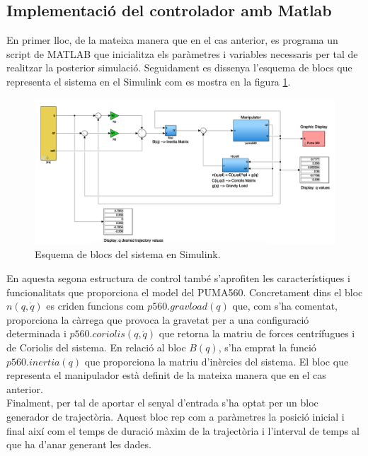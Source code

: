 \documentclass[]{article}
\begin{document}
\subsection{Implementació del controlador amb Matlab}
En primer lloc, de la mateixa manera que en el cas anterior, es programa un script de MATLAB que inicialitza els paràmetres i variables necessaris per tal de realitzar la posterior simulació. Seguidament es dissenya l'esquema de blocs que representa el sistema en el Simulink com es mostra en la figura \ref{fig:Inverse_dynamics_simulink}. 

\begin{figure}[H]
\centering
    \includegraphics[width = 1\linewidth]{images/Inverse_Dynamics_Simulink.png}
    \caption{Esquema de blocs del sistema en Simulink.}
    \label{fig:Inverse_dynamics_simulink}
\end{figure}

En aquesta segona estructura de control també s'aprofiten les característiques i funcionalitats que proporciona el model del PUMA560. Concretament dins el bloc $n(q,\dot{q})$ es criden funcions com $p560.gravload(q)$ que, com s'ha comentat, proporciona la càrrega que provoca la gravetat per a una configuració determinada i $p560.coriolis(q,\dot{q})$ que retorna la matriu de forces centrífugues i de Coriolis del sistema. En relació al bloc $B(q)$, s'ha emprat la funció $p560.inertia(q)$ que proporciona la matriu d'inèrcies del sistema. El bloc que representa el manipulador està definit de la mateixa manera que en el cas anterior.\\

Finalment, per tal de aportar el senyal d'entrada s'ha optat per un bloc generador de trajectòria. Aquest bloc rep com a paràmetres la posició inicial i final així com el temps de duració màxim de la trajectòria i l'interval de temps al que ha d'anar generant les dades.\\
\end{document}
